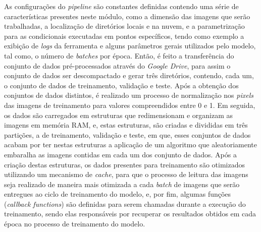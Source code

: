 \documentclass[
	12pt,				%
	oneside,			%
	a4paper,			%
	english,			%
	brazil				%
	]{abntex2ppgsi}
\begin{document}
As configurações do \textit{pipeline} são constantes definidas contendo uma série de características presentes neste módulo, como a dimensão das imagens que serão trabalhadas, a localização de diretórios locais e na nuvem, e a parametrização para as condicionais executadas em pontos específicos, tendo como exemplo a exibição de \textit{logs} da ferramenta e alguns parâmetros gerais utilizados pelo modelo, tal como, o número de \textit{batches} por época. Então, é feito a transferência do conjunto de dados pré-processados através do \textit{Google Drive}, para assim o conjunto de dados ser descompactado e gerar três diretórios, contendo, cada um, o conjunto de dados de treinamento, validação e teste. Após a obtenção dos conjuntos de dados distintos, é realizado um processo de normalização nos \textit{pixels} das imagens de treinamento para valores compreendidos entre 0 e 1. Em seguida, os dados são carregados em estruturas que redimensionam e organizam as imagens em memória RAM, e, estas estruturas, são criadas e divididas em três partições, a de treinamento, validação e teste, em que, esses conjuntos de dados acabam por ter nestas estruturas a aplicação de um algoritmo que aleatoriamente embaralha as imagens contidas em cada um dos conjunto de dados. Após a criação destas estruturas, os dados presentes para treinamento são otimizados utilizando um mecanismo de \textit{cache}, para que o processo de leitura das imagens seja realizado de maneira mais otimizada a cada \textit{batch} de imagens que serão entregues ao ciclo de treinamento do modelo, e, por fim, algumas funções (\textit{callback functions}) são definidas para serem chamadas durante a execução do treinamento, sendo elas responsáveis por recuperar os resultados obtidos em cada época no processo de treinamento do modelo.
\end{document}
